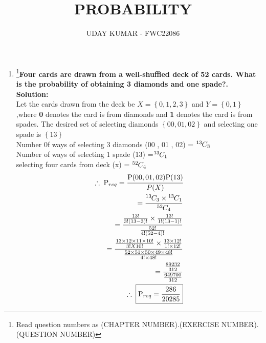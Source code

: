 \documentclass{article}
\providecommand{\cbrak}[1]{\ensuremath{\left\{#1\right\}}}
\newcommand{\solution}{\noindent \textbf{Solution: }}
\newcommand*{\permcomb}[4][0mu]{{{}^{#3}\mkern#1#2_{#4}}}
\newcommand*{\comb}[1][-1mu]{\permcomb[#1]{C}}
\begin{document}
\title{PROBABILITY}
\author{\Large UDAY KUMAR - FWC22086}
\date{}

\maketitle

\begin{enumerate}[label=16.\arabic{enumi}.\arabic{enumii}]%
\setcounter{enumi}{3}
\setcounter{enumii}{2}

\item \footnote{Read question numbers as (CHAPTER NUMBER).(EXERCISE NUMBER).(QUESTION NUMBER)}\textbf {Four cards are drawn from a well-shuffled deck of 52 cards. What is the probability of obtaining 3 diamonds and one spade?.}\\[1ex]
	\solution\\
		Let the cards drawn from the deck be $X = \cbrak{0,1,2,3}$ and $Y = \cbrak{0,1}$,where \textbf 0 denotes the card is from diamonds and \textbf 1 denotes the card is from spades.
		 The desired set of selecting diamonds $\cbrak{00,01,02}$
 and selecting one spade is $\cbrak{ 13 }$\\

 Number 0f ways of selecting 3 diamonds (00 , 01 , 02)  = $\comb{13}{3}$\\
  Number of ways of selecting 1 spade (13) =$\comb{13}{1}$\\
   selecting four cards from deck (x) = $\comb{52}{4}$\\
	\begin{align*}
	  \therefore \; \text{P}_{req} = \cfrac{\text{P}(00 , 01 , 02)  \text{P}(13)}{P(X)}\\	  
 = \dfrac{\comb{13}{3} \times \comb{13}{1}}{\comb{52}{4}}\\ 
= \dfrac{\frac{13!}{3!(13-3)!} \times \frac{13!}{1!(13-1)!}}{\frac{52!}{4!(52-4)!}}\\
= \dfrac{\frac{13\times12\times11\times10!}{3!X10!}\times\frac{13\times12!}{1!\times12!}}{\frac{52\times51\times50\times49\times48!}{4!\times48!}}\\
= \dfrac{\frac{89232}{312}}{\frac{649700}{312}}\\
\therefore \; \boxed{\text{P}_{req} = \frac{286}{20285}}\\
\end{align*}
		
	
		

    

\end{enumerate}
\end{document}
